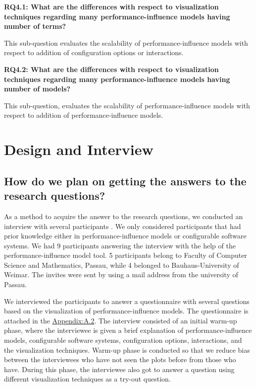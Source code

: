 \begin{mdframed}
\textbf{RQ4.1: What are the differences with respect to visualization techniques regarding many performance-influence models having number of terms?}
\end{mdframed}

This sub-question evaluates the scalability of performance-influence models with respect to addition of configuration options or interactions.

\begin{mdframed}
\textbf{RQ4.2: What are the differences with respect to visualization techniques regarding many performance-influence models having number of models?}
\end{mdframed}

This sub-question, evaluates the scalability of performance-influence models with respect to addition of performance-influence models.

\section{Design and Interview}
\label{sec:3.2}
\subsection{How do we plan on getting the answers to the research questions?}

As a method to acquire the answer to the research questions, we conducted an interview with several participants \cite{dillman2014internet}. We only considered participants that had  prior knowledge either in performance-influence models or configurable software systems. We had 9 participants answering the interview with the help of the performance-influence model tool. 
5 participants belong to Faculty of Computer Science and Mathematics, Passau, while 4 belonged to Bauhaus-University of Weimar. The invites were sent by using a mail address from the university of Passau.

We interviewed the participants to answer a questionnaire with several questions based on the visualization of performance-influence models. The questionnaire is attached in the 
\hyperref[appendix:questionnaire]{Appendix:A.2}. The interview consisted of an initial warm-up phase, where the interviewee is given a brief explanation of performance-influence models, configurable software systems, configuration options, interactions, and the visualization techniques. Warm-up phase is conducted so that we reduce bias between the interviewees who have not seen the plots before from those who have. During this phase, the interviewee also got to answer a question using different visualization techniques as a try-out question.

